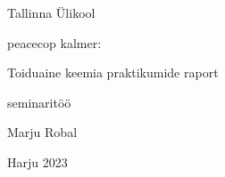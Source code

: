 \begin{titlepage}
\par{Tallinna Ülikool}
\vspace{0.3\textheight}
\par{peacecop kalmer:}
\LARGE
\par{Toiduaine keemia praktikumide raport}
\normalsize
\par{seminaritöö}
\vspace{0.3\textheight}
\begin{flushright}
\par{Marju Robal}
\end{flushright}
\vfill
Harju
\hfill
2023
\end{titlepage}
